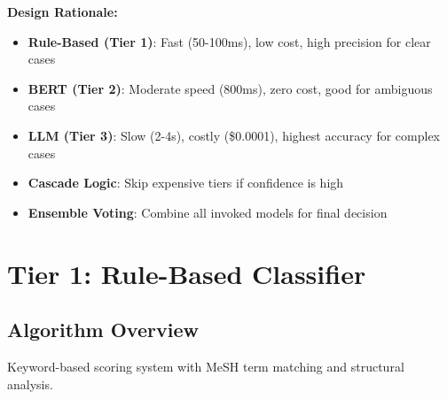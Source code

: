 \textbf{Design Rationale:}
\begin{itemize}
    \item \textbf{Rule-Based (Tier 1)}: Fast (50-100ms), low cost, high precision for clear cases
    \item \textbf{BERT (Tier 2)}: Moderate speed (800ms), zero cost, good for ambiguous cases
    \item \textbf{LLM (Tier 3)}: Slow (2-4s), costly (\$0.0001), highest accuracy for complex cases
    \item \textbf{Cascade Logic}: Skip expensive tiers if confidence is high
    \item \textbf{Ensemble Voting}: Combine all invoked models for final decision
\end{itemize}

\section{Tier 1: Rule-Based Classifier}

\subsection{Algorithm Overview}

Keyword-based scoring system with MeSH term matching and structural analysis.

